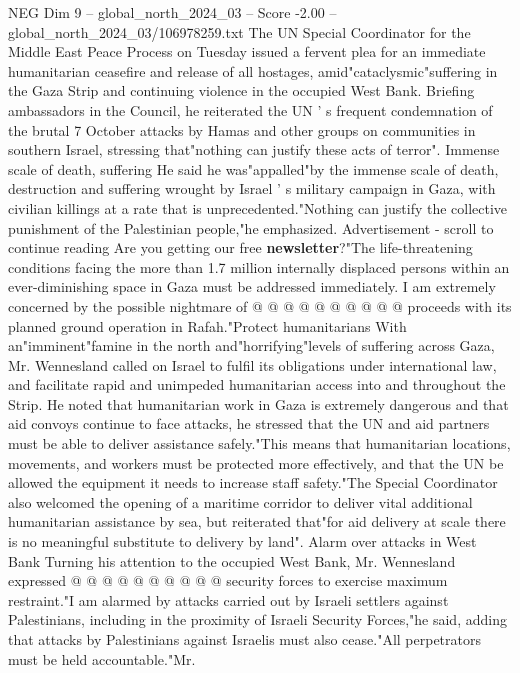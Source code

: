 \begin{textsample}{NEG Dim 9 – global\_north\_2024\_03 – Score -2.00 – global\_north\_2024\_03/106978259.txt}  \label{ex:f9_neg_181}
The UN Special Coordinator for the Middle East Peace Process on Tuesday issued a fervent plea for an immediate humanitarian ceasefire and release of all hostages, amid"cataclysmic"suffering in the Gaza Strip and continuing violence in the occupied West Bank.
Briefing ambassadors in the Council, he reiterated the UN ' s frequent condemnation of the brutal 7 October attacks by Hamas and other groups on communities in southern Israel, stressing that"nothing can justify these acts of terror".
Immense scale of death, suffering He said he was"appalled"by the immense scale of death, destruction and suffering wrought by Israel ' s military campaign in Gaza, with civilian killings at a rate that is unprecedented."Nothing can justify the collective punishment of the Palestinian people,"he emphasized.
Advertisement - scroll to continue reading Are you getting our free \textbf{newsletter}?"The life-threatening conditions facing the more than 1.7 million internally displaced persons within an ever-diminishing space in Gaza must be addressed immediately.
I am extremely concerned by the possible nightmare of @ @ @ @ @ @ @ @ @ @ proceeds with its planned ground operation in Rafah."Protect humanitarians With an"imminent"famine in the north and"horrifying"levels of suffering across Gaza, Mr.
Wennesland called on Israel to fulfil its obligations under international law, and facilitate rapid and unimpeded humanitarian access into and throughout the Strip.
He noted that humanitarian work in Gaza is extremely dangerous and that aid convoys continue to face attacks, he stressed that the UN and aid partners must be able to deliver assistance safely."This means that humanitarian locations, movements, and workers must be protected more effectively, and that the UN be allowed the equipment it needs to increase staff safety."The Special Coordinator also welcomed the opening of a maritime corridor to deliver vital additional humanitarian assistance by sea, but reiterated that"for aid delivery at scale there is no meaningful substitute to delivery by land".
Alarm over attacks in West Bank Turning his attention to the occupied West Bank, Mr.
Wennesland expressed @ @ @ @ @ @ @ @ @ @ security forces to exercise maximum restraint."I am alarmed by attacks carried out by Israeli settlers against Palestinians, including in the proximity of Israeli Security Forces,"he said, adding that attacks by Palestinians against Israelis must also cease."All perpetrators must be held accountable."Mr.

\end{textsample}
